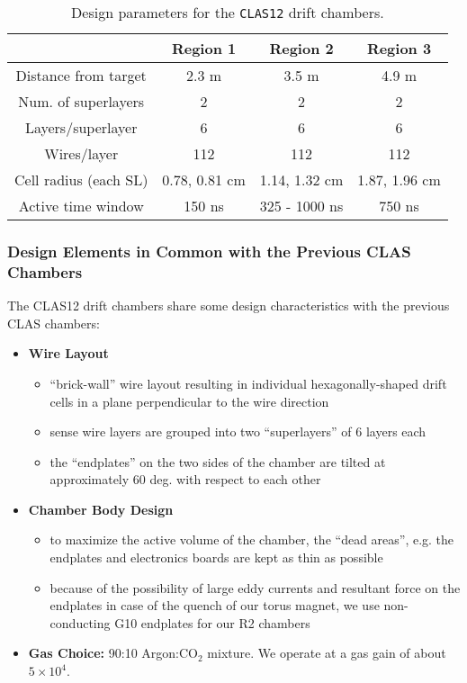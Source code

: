 \small{
\begin{table}[hbt]
\begin{center}
\begin{tabular}{||c|c|c|c||} \hline \hline
            &{\bf Region 1}&{\bf Region 2}&{\bf Region 3}\\ \hline
Distance from target & 2.3 m    & 3.5 m        & 4.9 m    \\ \hline
Num. of superlayers  & 2        & 2            & 2        \\ \hline
Layers/superlayer    & 6        & 6            & 6        \\ \hline
Wires/layer          & 112      & 112          & 112      \\ \hline
Cell radius (each SL) & 0.78, 0.81 cm  & 1.14, 1.32 cm      & 1.87, 1.96 cm  \\ \hline
Active time window   & 150 ns   & 325 - 1000 ns & 750 ns   \\ \hline
\end{tabular}
\caption{\small{Design parameters for the {\tt CLAS12} drift chambers.}}
\label{fwd-dc-design-parms}
\end{center}
\end{table}
}

\subsubsection{Design Elements in Common with the Previous CLAS Chambers}
The CLAS12 drift chambers share some design characteristics with the
previous CLAS chambers:
\begin{itemize}
\item {\bf Wire Layout}
\begin{itemize}
\item ``brick-wall'' wire layout resulting in individual hexagonally-shaped
drift cells in a plane perpendicular to the wire direction
\item sense wire layers are grouped into two ``superlayers'' of 6 layers each
\item the ``endplates'' on the two sides of the chamber are tilted 
at approximately 60 deg. with respect to each other
\end{itemize}
\item {\bf Chamber Body Design}
\begin{itemize}
\item to maximize the active volume of the chamber, the ``dead areas'', e.g.
the endplates and electronics boards are kept as thin as possible
\item because of the possibility of large eddy currents and resultant
force on the endplates in case of the quench of our torus magnet, we
use non-conducting G10 endplates for our R2 chambers
\end{itemize}
\item {\bf Gas Choice:} 90:10 Argon:CO$_2$ mixture.  We operate at a gas gain of 
about $5 \times 10^4$.
\end{itemize}


